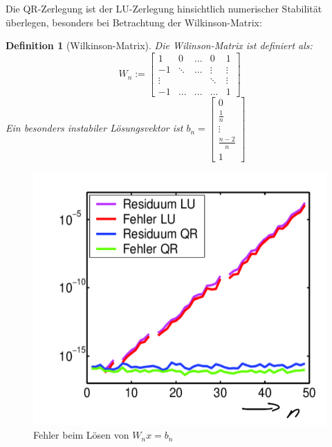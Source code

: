 \documentclass[10pt,a4paper]{article}
\newtheorem{definition}{Definition}
\begin{document}
	Die QR-Zerlegung ist der LU-Zerlegung hinsichtlich numerischer Stabilität überlegen, besonders bei Betrachtung der Wilkinson-Matrix:
	\begin{definition}[Wilkinson-Matrix]
		Die Wilinson-Matrix ist definiert als:
		$$W_n := \begin{bmatrix}
			1 & 0 & ... & 0 & 1\\
			-1 & \ddots & ... & \vdots & \vdots\\
			\vdots& & & \ddots & \vdots\\
			-1 & ... & ... & \dots&1
		\end{bmatrix}$$
		Ein besonders instabiler Lösungsvektor ist $b_n = \begin{bmatrix}
			0\\
			\frac{1}{n}\\
			\vdots\\
			\frac{n-2}{n}\\
			1
		\end{bmatrix}$
	\end{definition}
	\begin{figure}
		\centering
		\includegraphics{"FehlerWilkinson.png"}
		\caption{Fehler beim Lösen von $W_nx =b_n$}
	\end{figure}
\end{document}
